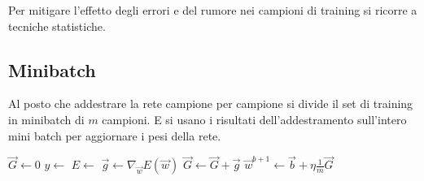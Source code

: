 Per mitigare l'effetto degli errori e del rumore nei campioni di training si ricorre a tecniche statistiche.

\subsection{Minibatch}
Al posto che addestrare la rete campione per campione si divide il set di training in minibatch di $m$ campioni. E si usano i risultati dell'addestramento sull'intero mini batch per aggiornare i pesi della rete.
\vspace{.5cm}
\begin{algorithmic}
			\State $\vec{G} \gets 0$ 
				\State $y \gets$  
				\State $E \gets$ 
				\State $\vec{g} \gets \nabla_{\vec{w}}E(\vec{w})$ 
				\State $\vec{G} \gets \vec{G} + \vec{g}$ 
			\EndFor
			\State $\vec{w}^{b + 1} \gets \vec{b} + \eta \frac{1}{m} \vec{G}$ 
		\EndFor
	\EndFunction    
\end{algorithmic}

